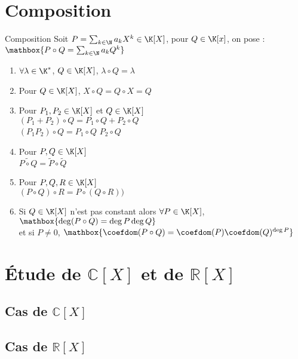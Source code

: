 \documentclass[12pt,a4paper]{report}
\begin{document}
\section{Composition}

\begin{definition}{Composition}{}
Soit $P = \sum_{k\in \N} a_k X^k \in \K[X]$, pour $Q \in \K[x]$, on pose :
\center $\mathbox{P\circ Q= \sum_{k\in \N} a_k Q^k}$ 
\end{definition}

\begin{propositions}{}{}
\begin{enumerate}
    \item $\forall \lambda \in \K^*$, $Q\in \K[X]$, $\lambda\circ Q =\lambda$
    \item Pour $Q \in \K[X]$, $X\circ Q = Q\circ X = Q$
    \item Pour $P_1, P_2 \in \K[X]$ et $Q \in \K[X]$\\
    $(P_1 + P_2)\circ Q = P_1 \circ Q + P_2 \circ Q$\\
    $(P_1 P_2)\circ Q = P_1 \circ Q$ $P_2 \circ Q$
    \item Pour $P,Q \in \K[X]$\\
    $\widetilde{P\circ Q}=\widetilde{P}\circ \widetilde{Q}$
    \item Pour $P,Q,R \in \K[X]$ \\
    $(P\circ Q)\circ R = P \circ (Q \circ R))$
    \item Si $Q \in \K[X]$ n'est pas constant alors $\forall P \in \K[X]$, $\mathbox{\deg (P\circ Q)= \deg P \deg Q}$\\  et si $P \neq 0$, $\mathbox{\coefdom(P\circ Q) = \coefdom (P) \coefdom(Q)^{\deg P}}$
\end{enumerate}
\end{propositions}

\begin{demo}

\end{demo}


\section {Étude de $\mathbb{C}[X]$ et de $\mathbb{R}[X]$}
    \subsection{Cas de $\mathbb{C}[X]$}
    \subsection{Cas de $\mathbb{R}[X]$}
\end{document}

